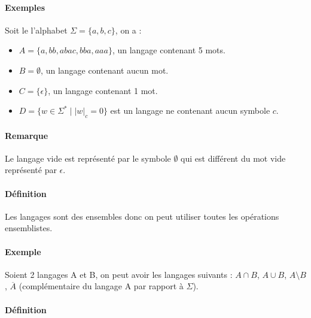 

\paragraph{Exemples} %
\label{par:exemples}

Soit le l'alphabet $\Sigma=\{a,b,c\}$, on a :

\begin{itemize}
	\item $A=\{a,bb,abac,bba,aaa\}$, un langage contenant 5 mots.
	\item $B=\emptyset$, un langage contenant aucun mot.
	\item $C=\{\epsilon\}$, un langage contenant 1 mot.
	\item $D=\{w \in \Sigma^* \mid \left|w\right|_c=0\}$ est un langage ne contenant aucun symbole $c$.
\end{itemize}



\paragraph{Remarque} %
\label{par:remarque}

Le langage vide est représenté par le symbole $\emptyset$ qui est différent du mot vide représenté par $\epsilon$.



\paragraph{Définition} %
\label{par:d_finition}

Les langages sont des ensembles donc on peut utiliser toutes les opérations ensemblistes.



\paragraph{Exemple} %
\label{par:exemple}

Soient 2 langages A et B, on peut avoir les langages suivants : $A \cap B$, $A \cup B$, $A \setminus B$, $\overline{A}$ (complémentaire du langage A par rapport à $\Sigma$).



\paragraph{Définition} %
\label{par:d_finition}

